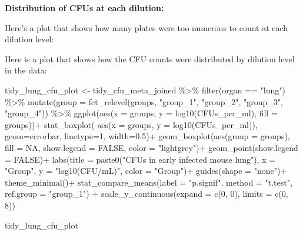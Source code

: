 \documentclass[
]{book}
\newenvironment{Shaded}{\begin{snugshade}}{\end{snugshade}}
\newcommand{\AttributeTok}[1]{\textcolor[rgb]{0.77,0.63,0.00}{#1}}
\newcommand{\ConstantTok}[1]{\textcolor[rgb]{0.00,0.00,0.00}{#1}}
\newcommand{\DecValTok}[1]{\textcolor[rgb]{0.00,0.00,0.81}{#1}}
\newcommand{\FloatTok}[1]{\textcolor[rgb]{0.00,0.00,0.81}{#1}}
\newcommand{\FunctionTok}[1]{\textcolor[rgb]{0.00,0.00,0.00}{#1}}
\newcommand{\NormalTok}[1]{#1}
\newcommand{\OtherTok}[1]{\textcolor[rgb]{0.56,0.35,0.01}{#1}}
\newcommand{\SpecialCharTok}[1]{\textcolor[rgb]{0.00,0.00,0.00}{#1}}
\newcommand{\StringTok}[1]{\textcolor[rgb]{0.31,0.60,0.02}{#1}}
\begin{document}
\textbf{Distribution of CFUs at each dilution:}

Here's a plot that shows how many plates were too numerous to count at each
dilution level:

Here is a plot that shows how the CFU counts were distributed by dilution
level in the data:

\begin{Shaded}
\begin{Highlighting}[]
\NormalTok{tidy\_lung\_cfu\_plot }\OtherTok{\textless{}{-}}\NormalTok{ tidy\_cfu\_meta\_joined }\SpecialCharTok{\%\textgreater{}\%}
  \FunctionTok{filter}\NormalTok{(organ }\SpecialCharTok{==} \StringTok{"lung"}\NormalTok{) }\SpecialCharTok{\%\textgreater{}\%}
  \FunctionTok{mutate}\NormalTok{(}\AttributeTok{group =} \FunctionTok{fct\_relevel}\NormalTok{(groups, }\StringTok{"group\_1"}\NormalTok{, }\StringTok{"group\_2"}\NormalTok{, }\StringTok{"group\_3"}\NormalTok{, }\StringTok{"group\_4"}\NormalTok{)) }\SpecialCharTok{\%\textgreater{}\%}
  \FunctionTok{ggplot}\NormalTok{(}\FunctionTok{aes}\NormalTok{(}\AttributeTok{x =}\NormalTok{ groups, }\AttributeTok{y =} \FunctionTok{log10}\NormalTok{(CFUs\_per\_ml), }\AttributeTok{fill =}\NormalTok{ groups))}\SpecialCharTok{+}
  \FunctionTok{stat\_boxplot}\NormalTok{( }\FunctionTok{aes}\NormalTok{(}\AttributeTok{x =}\NormalTok{ groups, }\AttributeTok{y =} \FunctionTok{log10}\NormalTok{(CFUs\_per\_ml)), }
    \AttributeTok{geom=}\StringTok{\textquotesingle{}errorbar\textquotesingle{}}\NormalTok{, }\AttributeTok{linetype=}\DecValTok{1}\NormalTok{, }\AttributeTok{width=}\FloatTok{0.5}\NormalTok{)}\SpecialCharTok{+} 
  \FunctionTok{geom\_boxplot}\NormalTok{(}\FunctionTok{aes}\NormalTok{(}\AttributeTok{group =}\NormalTok{ groups), }\AttributeTok{fill =} \ConstantTok{NA}\NormalTok{, }\AttributeTok{show.legend =} \ConstantTok{FALSE}\NormalTok{, }\AttributeTok{color =} \StringTok{"lightgrey"}\NormalTok{)}\SpecialCharTok{+}
  \FunctionTok{geom\_point}\NormalTok{(}\AttributeTok{show.legend =} \ConstantTok{FALSE}\NormalTok{)}\SpecialCharTok{+}
  \FunctionTok{labs}\NormalTok{(}\AttributeTok{title =} \FunctionTok{paste0}\NormalTok{(}\StringTok{"CFUs in early infected mouse lung"}\NormalTok{), }\AttributeTok{x =} \StringTok{"Group"}\NormalTok{, }\AttributeTok{y =} \StringTok{"log10(CFU/mL)"}\NormalTok{,}
       \AttributeTok{color =} \StringTok{"Group"}\NormalTok{)}\SpecialCharTok{+}
  \FunctionTok{guides}\NormalTok{(}\AttributeTok{shape =} \StringTok{"none"}\NormalTok{)}\SpecialCharTok{+}
  \FunctionTok{theme\_minimal}\NormalTok{()}\SpecialCharTok{+}
  \FunctionTok{stat\_compare\_means}\NormalTok{(}\AttributeTok{label =} \StringTok{"p.signif"}\NormalTok{, }\AttributeTok{method =} \StringTok{"t.test"}\NormalTok{, }\AttributeTok{ref.group =} \StringTok{"group\_1"}\NormalTok{) }\SpecialCharTok{+} 
  \FunctionTok{scale\_y\_continuous}\NormalTok{(}\AttributeTok{expand =} \FunctionTok{c}\NormalTok{(}\DecValTok{0}\NormalTok{, }\DecValTok{0}\NormalTok{), }\AttributeTok{limits =} \FunctionTok{c}\NormalTok{(}\DecValTok{0}\NormalTok{, }\DecValTok{8}\NormalTok{))}

\NormalTok{tidy\_lung\_cfu\_plot}
\end{Highlighting}
\end{Shaded}
\end{document}
